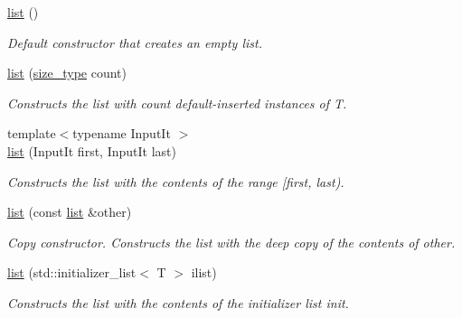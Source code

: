 \begin{DoxyCompactItemize}
\item 
\mbox{\label{classls_1_1list_a3717713cf5e4558e543b533d14eef424}} 
\hyperlink{classls_1_1list_a3717713cf5e4558e543b533d14eef424}{list} ()
\begin{DoxyCompactList}\small\item\em Default constructor that creates an empty list. \end{DoxyCompactList}\item 
\mbox{\label{classls_1_1list_a4badb105feef42346fbc3a26be770387}} 
\hyperlink{classls_1_1list_a4badb105feef42346fbc3a26be770387}{list} (\hyperlink{classls_1_1list_a91bb77719712ad6127f0bdf97ed5bd64}{size\+\_\+type} count)
\begin{DoxyCompactList}\small\item\em Constructs the list with count default-\/inserted instances of T. \end{DoxyCompactList}\item 
\mbox{\label{classls_1_1list_a783b17259b4ac0805c58d6a959d3c11f}} 
{\footnotesize template$<$typename Input\+It $>$ }\\\hyperlink{classls_1_1list_a783b17259b4ac0805c58d6a959d3c11f}{list} (Input\+It first, Input\+It last)
\begin{DoxyCompactList}\small\item\em Constructs the list with the contents of the range \mbox{[}first, last). \end{DoxyCompactList}\item 
\mbox{\label{classls_1_1list_a167e96cf439f62fbefca1d06a958c798}} 
\hyperlink{classls_1_1list_a167e96cf439f62fbefca1d06a958c798}{list} (const \hyperlink{classls_1_1list}{list} \&other)
\begin{DoxyCompactList}\small\item\em Copy constructor. Constructs the list with the deep copy of the contents of other. \end{DoxyCompactList}\item 
\mbox{\label{classls_1_1list_ac4d5e3102e51f80bcc82fdab0b8d187f}} 
\hyperlink{classls_1_1list_ac4d5e3102e51f80bcc82fdab0b8d187f}{list} (std\+::initializer\+\_\+list$<$ T $>$ ilist)
\begin{DoxyCompactList}\small\item\em Constructs the list with the contents of the initializer list init. \end{DoxyCompactList}\item 

\end{DoxyCompactItemize}
